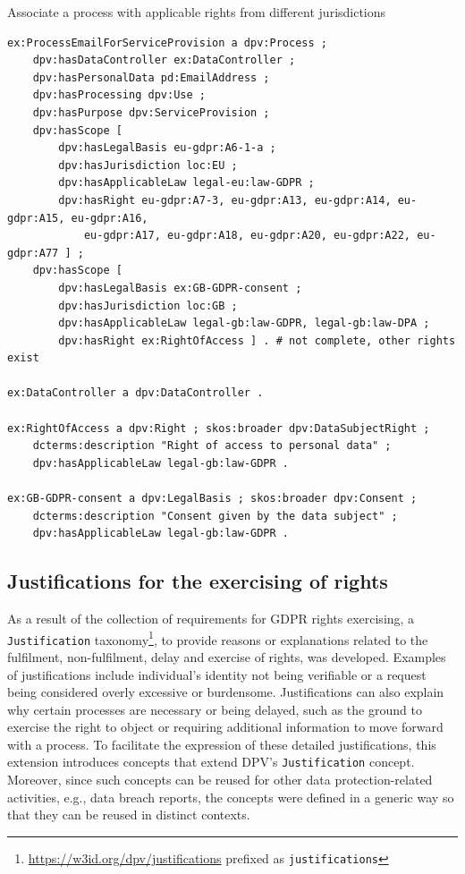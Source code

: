 \documentclass{IOS-Book-Article}     %
\begin{document}
\begin{listing}[ht]
\caption{Associate a process with applicable rights from different jurisdictions}
\label{lst:rights}
\begin{verbatim}
ex:ProcessEmailForServiceProvision a dpv:Process ;
    dpv:hasDataController ex:DataController ;
    dpv:hasPersonalData pd:EmailAddress ;
    dpv:hasProcessing dpv:Use ;
    dpv:hasPurpose dpv:ServiceProvision ;
    dpv:hasScope [
        dpv:hasLegalBasis eu-gdpr:A6-1-a ;
        dpv:hasJurisdiction loc:EU ;
        dpv:hasApplicableLaw legal-eu:law-GDPR ;
        dpv:hasRight eu-gdpr:A7-3, eu-gdpr:A13, eu-gdpr:A14, eu-gdpr:A15, eu-gdpr:A16, 
            eu-gdpr:A17, eu-gdpr:A18, eu-gdpr:A20, eu-gdpr:A22, eu-gdpr:A77 ] ;
    dpv:hasScope [
        dpv:hasLegalBasis ex:GB-GDPR-consent ;
        dpv:hasJurisdiction loc:GB ;
        dpv:hasApplicableLaw legal-gb:law-GDPR, legal-gb:law-DPA ;
        dpv:hasRight ex:RightOfAccess ] . # not complete, other rights exist

ex:DataController a dpv:DataController .

ex:RightOfAccess a dpv:Right ; skos:broader dpv:DataSubjectRight ;
    dcterms:description "Right of access to personal data" ;
    dpv:hasApplicableLaw legal-gb:law-GDPR .

ex:GB-GDPR-consent a dpv:LegalBasis ; skos:broader dpv:Consent ;
    dcterms:description "Consent given by the data subject" ;
    dpv:hasApplicableLaw legal-gb:law-GDPR .
\end{verbatim}
\end{listing}

\subsection{Justifications for the exercising of rights}
\label{sec:justifications}

As a result of the collection of requirements for GDPR rights exercising, a \texttt{Justification} taxonomy\footnote{\url{https://w3id.org/dpv/justifications} prefixed as \texttt{justifications}}, to provide reasons or explanations related to the fulfilment, non-fulfilment, delay and exercise of rights, was developed.
Examples of justifications include individual's identity not being verifiable or a request being considered overly excessive or burdensome.
Justifications can also explain why certain processes are necessary or being delayed, such as the ground to exercise the right to object or requiring additional information to move forward with a process.
To facilitate the expression of these detailed justifications, this extension introduces concepts that extend DPV's \texttt{Justification} concept.
Moreover, since such concepts can be reused for other data protection-related activities, e.g., data breach reports, the concepts were defined in a generic way so that they can be reused in distinct contexts.
\end{document}
